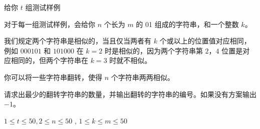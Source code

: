 给你 $t$ 组测试样例

对于每一组测试样例，会给你 $n$ 个长为 $m$ 的 01 组成的字符串，和一个整数 $k$。

我们规定两个字符串是相似的，当且仅当两者有 $k$ 个或以上的位置值对应相同，例如 $000101$ 和 $101000$ 在 $k=2$ 时是相似的，因为两个字符串第 $2$，$4$ 位置是对应相同的，但两个字符串在 $k=3$ 时就不相似。

你可以将一些字符串翻转，使得 $n$ 个字符串两两相似。

请求出最少的翻转字符串的数量，并输出翻转的字符串的编号。如果没有方案输出 $-1$。

$ 1 \le t \le 50 ,2 \le n \le 50 $ , $ 1 \le k \le m \le 50$
